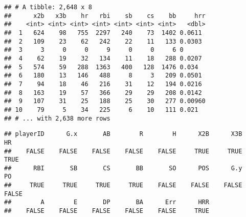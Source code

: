 \documentclass[]{book}
\newenvironment{Shaded}{\begin{snugshade}}{\end{snugshade}}
\newcommand{\KeywordTok}[1]{\textcolor[rgb]{0.13,0.29,0.53}{\textbf{#1}}}
\newcommand{\DecValTok}[1]{\textcolor[rgb]{0.00,0.00,0.81}{#1}}
\newcommand{\StringTok}[1]{\textcolor[rgb]{0.31,0.60,0.02}{#1}}
\newcommand{\CommentTok}[1]{\textcolor[rgb]{0.56,0.35,0.01}{\textit{#1}}}
\newcommand{\ControlFlowTok}[1]{\textcolor[rgb]{0.13,0.29,0.53}{\textbf{#1}}}
\newcommand{\OperatorTok}[1]{\textcolor[rgb]{0.81,0.36,0.00}{\textbf{#1}}}
\newcommand{\NormalTok}[1]{#1}
\begin{document}
\begin{Shaded}
\end{Shaded}

\begin{verbatim}
## # A tibble: 2,648 x 8
##      x2b   x3b    hr   rbi    sb    cs    bb     hrr
##    <int> <int> <int> <int> <int> <int> <int>   <dbl>
##  1   624    98   755  2297   240    73  1402 0.0611 
##  2   109    23    62   242    22    11   133 0.0303 
##  3     3     0     0     9     0     0     6 0      
##  4    62    19    32   134    11    18   288 0.0207 
##  5   574    59   288  1363   400   128  1476 0.034  
##  6   180    13   146   488     8     3   209 0.0501 
##  7    94    18    46   216    31    12   194 0.0216 
##  8   163    19    57   366    29    29   208 0.0142 
##  9   107    31    25   188    25    30   277 0.00960
## 10    79     5    34   225     6    10   111 0.021  
## # ... with 2,638 more rows
\end{verbatim}

\begin{Shaded}
\end{Shaded}

\begin{verbatim}
## playerID      G.x       AB        R        H      X2B      X3B       HR 
##    FALSE    FALSE    FALSE    FALSE    FALSE     TRUE     TRUE     TRUE 
##      RBI       SB       CS       BB       SO      POS      G.y       PO 
##     TRUE     TRUE     TRUE     TRUE    FALSE    FALSE    FALSE    FALSE 
##        A        E       DP       BA      Err      HRR 
##    FALSE    FALSE    FALSE    FALSE    FALSE     TRUE
\end{verbatim}
\end{document}
